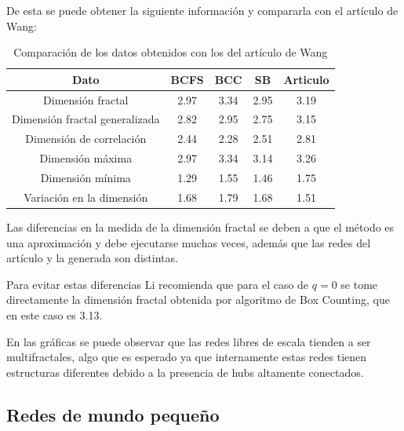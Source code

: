 De esta se puede obtener la siguiente información y compararla con el artículo de Wang\cite{Wang2012}:

\begin{table}[H]
    \centering
    \begin{tabular}{|c|c|c|c|c|}
        \hline
         \textbf{Dato}& \textbf{BCFS} & \textbf{BCC} & \textbf{SB} & \textbf{Articulo} \\
         \hline
         Dimensión fractal & 2.97 & 3.34 & 2.95 & 3.19 \\
         \hline
         Dimensión fractal generalizada & 2.82 & 2.95 & 2.75 &3.15  \\
         \hline
         Dimensión de correlación & 2.44 & 2.28 & 2.51 &2.81 \\
         \hline
         Dimensión máxima & 2.97 & 3.34 & 3.14 &3.26 \\
         \hline
         Dimensión mínima & 1.29 & 1.55 & 1.46 &1.75 \\
         \hline
         Variación en la dimensión & 1.68 & 1.79 & 1.68 &1.51 \\
         \hline
    \end{tabular}
    \caption{Comparación de los datos obtenidos con los del artículo de Wang\cite{Wang2012}}
\end{table}

Las diferencias en la medida de la dimensión fractal se deben a que el método es una aproximación y debe ejecutarse muchas veces, además que las redes del artículo y la generada son distintas.

Para evitar estas diferencias Li\cite{Li2014} recomienda que para el caso de $q=0$ se tome directamente la dimensión fractal obtenida por algoritmo de Box Counting, que en este caso es 3.13.

En las gráficas se puede observar que las redes libres de escala tienden a ser multifractales, algo que es esperado ya que internamente estas redes tienen estructuras diferentes debido a la presencia de hubs altamente conectados.

\subsection{Redes de mundo pequeño}

